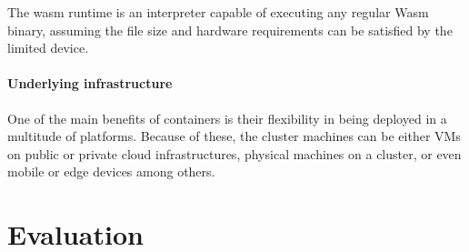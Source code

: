 The wasm runtime is an interpreter capable of executing any regular Wasm binary, assuming the file size and hardware requirements can be satisfied by the limited device.

\subsubsection{Underlying infrastructure}

One of the main benefits of containers is their flexibility in being deployed in a multitude of platforms. Because of these, the cluster machines can be either VMs on public or private cloud infrastructures, physical machines on a cluster, or even mobile or edge devices among others.

\chapter{Evaluation}
\label{sec:evaluation}






